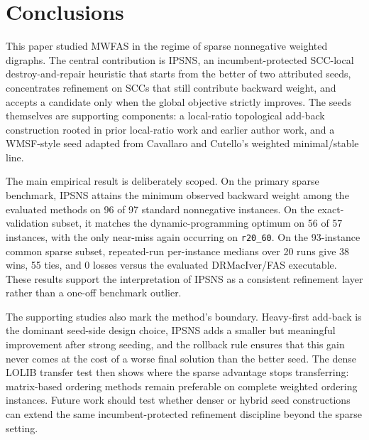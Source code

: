 \section{Conclusions}
\label{sec:conclusion}

This paper studied MWFAS in the regime of sparse nonnegative weighted digraphs. The central contribution is IPSNS, an incumbent-protected SCC-local destroy-and-repair heuristic that starts from the better of two attributed seeds, concentrates refinement on SCCs that still contribute backward weight, and accepts a candidate only when the global objective strictly improves. The seeds themselves are supporting components: a local-ratio topological add-back construction rooted in prior local-ratio work and earlier author work, and a WMSF-style seed adapted from Cavallaro and Cutello's weighted minimal/stable line.

The main empirical result is deliberately scoped. On the primary sparse benchmark, IPSNS attains the minimum observed backward weight among the evaluated methods on 96 of 97 standard nonnegative instances. On the exact-validation subset, it matches the dynamic-programming optimum on 56 of 57 instances, with the only near-miss again occurring on \texttt{r20\_60}. On the 93-instance common sparse subset, repeated-run per-instance medians over 20 runs give 38 wins, 55 ties, and 0 losses versus the evaluated DRMacIver/FAS executable. These results support the interpretation of IPSNS as a consistent refinement layer rather than a one-off benchmark outlier.

The supporting studies also mark the method's boundary. Heavy-first add-back is the dominant seed-side design choice, IPSNS adds a smaller but meaningful improvement after strong seeding, and the rollback rule ensures that this gain never comes at the cost of a worse final solution than the better seed. The dense LOLIB transfer test then shows where the sparse advantage stops transferring: matrix-based ordering methods remain preferable on complete weighted ordering instances. Future work should test whether denser or hybrid seed constructions can extend the same incumbent-protected refinement discipline beyond the sparse setting.
